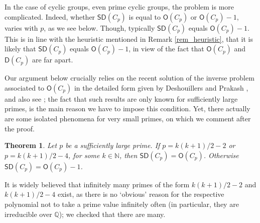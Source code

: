 \documentclass{amsart}
\newtheorem{thm}{Theorem}[section]
\theoremstyle{definition}
\numberwithin{equation}{section}
\begin{document}
In the case of cyclic groups,
even prime cyclic groups, the problem is more complicated.
Indeed, whether ${\mathsf{SD}}(C_p)$ is equal to ${\mathsf{O}}(C_p)$ or ${\mathsf{O}}(C_p)-1$,
varies with $p$, as we see below. Though, typically ${\mathsf{SD}}(C_p)$ equals  ${\mathsf{O}}(C_p)-1$.
This is in line with the heuristic mentioned in Remark \ref{rem_heuristic}, that it is likely that ${\mathsf{SD}}(C_p)$ equals  ${\mathsf{O}}(C_p)-1$,
in view of the fact that ${\mathsf{O}}(C_p)$ and ${\mathsf{D}}(C_p)$ are far apart.

Our argument below crucially relies on the recent solution of the inverse problem
associated to ${\mathsf{O}}(C_p)$ in the detailed form given by Deshouillers and Prakash \cite{Deshouillers}, and
also see \cite{vanvu}; the fact that such results are only known for sufficiently
large primes, is the main reason we have to impose this condition.
Yet, there actually are some isolated phenomena for very small primes, on which we comment after the proof.

\begin{thm}
Let $p$ be a sufficiently large prime.
If $p=k(k+1)/2 -2$ or $p=k(k+1)/2 -4$, for some $k \in \mathbb{N}$, then ${\mathsf{SD}}(C_p)={\mathsf{O}}(C_p)$.
Otherwise ${\mathsf{SD}}(C_p)= {\mathsf{O}}(C_p)-1$.
\end{thm}
It is widely believed that infinitely many primes of the form $k(k+1)/2 -2$ and $k(k+1)/2 -4$ exist,
as there is no `obvious' reason for the respective polynomial not to take a
prime value infinitely often (in particular, they are irreducible over $\mathbb{Q}$); we checked that there are many.
\end{document}
